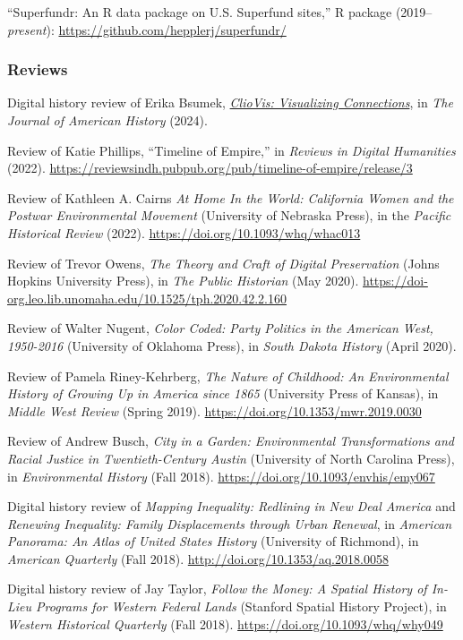 ``Superfundr: An R data package on U.S. Superfund sites,'' R package
(2019--\emph{present}): \url{https://github.com/hepplerj/superfundr/}

\subsubsection{Reviews}\label{reviews}

Digital history review of Erika Bsumek,
\emph{\href{https://cliovis.com}{ClioVis: Visualizing Connections}}, in
\emph{The Journal of American History} (2024).

Review of Katie Phillips, ``Timeline of Empire,'' in \emph{Reviews in
Digital Humanities} (2022).
\url{https://reviewsindh.pubpub.org/pub/timeline-of-empire/release/3}

Review of Kathleen A. Cairns \emph{At Home In the World: California
Women and the Postwar Environmental Movement} (University of Nebraska
Press), in the \emph{Pacific Historical Review} (2022).
\url{https://doi.org/10.1093/whq/whac013}

Review of Trevor Owens, \emph{The Theory and Craft of Digital
Preservation} (Johns Hopkins University Press), in \emph{The Public
Historian} (May 2020).
\url{https://doi-org.leo.lib.unomaha.edu/10.1525/tph.2020.42.2.160}

Review of Walter Nugent, \emph{Color Coded: Party Politics in the
American West, 1950-2016} (University of Oklahoma Press), in \emph{South
Dakota History} (April 2020).

Review of Pamela Riney-Kehrberg, \emph{The Nature of Childhood: An
Environmental History of Growing Up in America since 1865} (University
Press of Kansas), in \emph{Middle West Review} (Spring 2019).
\url{https://doi.org/10.1353/mwr.2019.0030}

Review of Andrew Busch, \emph{City in a Garden: Environmental
Transformations and Racial Justice in Twentieth-Century Austin}
(University of North Carolina Press), in \emph{Environmental History}
(Fall 2018). \url{https://doi.org/10.1093/envhis/emy067}

Digital history review of \emph{Mapping Inequality: Redlining in New
Deal America} and \emph{Renewing Inequality: Family Displacements
through Urban Renewal}, in \emph{American Panorama: An Atlas of United
States History} (University of Richmond), in \emph{American Quarterly}
(Fall 2018). \url{http://doi.org/10.1353/aq.2018.0058}

Digital history review of Jay Taylor, \emph{Follow the Money: A Spatial
History of In-Lieu Programs for Western Federal Lands} (Stanford Spatial
History Project), in \emph{Western Historical Quarterly} (Fall 2018).
\url{https://doi.org/10.1093/whq/why049}

